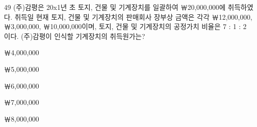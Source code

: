 \begin{question}{49}
(주)감평은 20x1년 초 토지, 건물 및 기계장치를 일괄하여 ￦20,000,000에 취득하였다. 취득일 현재 토지, 건물 및 기계장치의 판매회사 장부상 금액은 각각 ￦12,000,000, ￦3,000,000, ￦10,000,000이며, 토지, 건물 및 기계장치의 공정가치 비율은 7 : 1 : 2 이다. (주)감평이 인식할 기계장치의 취득원가는?
\begin{choices}
  \item ￦4,000,000
  \item ￦5,000,000
  \item ￦6,000,000
  \item ￦7,000,000
  \item ￦8,000,000
\end{choices}
\end{question}
